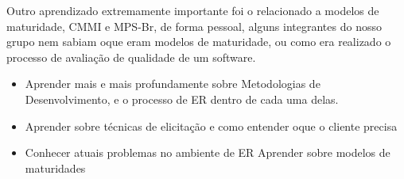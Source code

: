 Outro aprendizado extremamente importante foi o relacionado a modelos de maturidade, CMMI e MPS-Br, de forma pessoal,
alguns integrantes do nosso grupo nem sabiam oque eram modelos de maturidade, ou como era realizado o processo de
avaliação de qualidade de um software.

\begin{itemize}
\item Aprender mais e mais profundamente sobre Metodologias de Desenvolvimento, e o processo de ER dentro de cada uma delas.
\item Aprender sobre técnicas de elicitação e como entender oque o cliente precisa
\item Conhecer atuais problemas no ambiente de ER
  Aprender sobre modelos de maturidades

\end{itemize}
